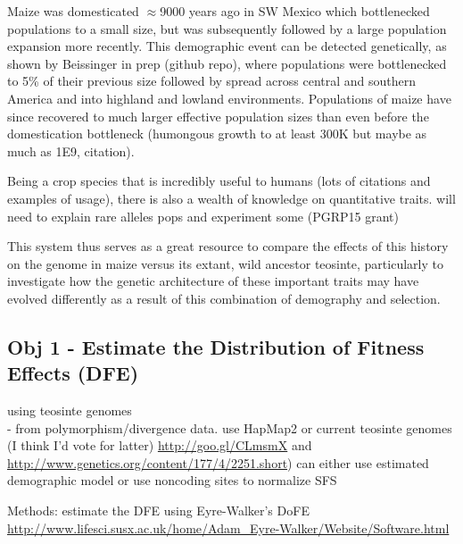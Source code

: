 	

Maize was domesticated $\approx$9000 years ago in SW Mexico which bottlenecked populations to a small size, but was subsequently followed by a large population expansion more recently. This demographic event can be detected genetically, as shown by Beissinger in prep (github repo), where populations were bottlenecked to 5\% of their previous size followed by spread across central and southern America and into highland and lowland environments. Populations of maize have since recovered to much larger effective population sizes than even before the domestication bottleneck (humongous growth to at least 300K but maybe as much as 1E9, citation).

Being a crop species that is incredibly useful to humans (lots of citations and examples of usage), there is also a wealth of knowledge on quantitative traits. 
will need to explain rare alleles pops and experiment some (PGRP15 grant)

This system thus serves as a great resource to compare the effects of this history on the genome in maize versus its extant, wild ancestor teosinte, particularly to investigate how the genetic architecture of these important traits may have evolved differently as a result of this combination of demography and selection.


\subsection{Obj 1 - Estimate the Distribution of Fitness Effects (DFE)}

	using teosinte genomes \\
		- from polymorphism/divergence data. use HapMap2 or current teosinte genomes (I think I'd vote for latter)
		\url{http://goo.gl/CLmsmX} and \url{http://www.genetics.org/content/177/4/2251.short})
		can either use estimated demographic model or use noncoding sites to normalize SFS
		
	Methods: estimate the DFE using Eyre-Walker's DoFE \url{http://www.lifesci.susx.ac.uk/home/Adam_Eyre-Walker/Website/Software.html}
	
